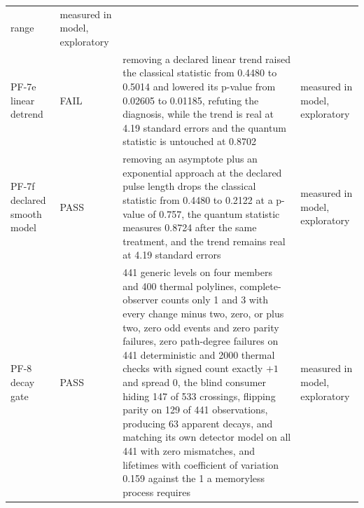 \documentclass[aps,pre,reprint,nofootinbib,floatfix]{revtex4-2}
\begin{document}
\begin{table}[p]
\begin{ruledtabular}
\begin{tabular}{L{2.5cm}L{1.9cm}L{9.0cm}L{2.7cm}}
range & measured in model, exploratory \\
PF-7e linear detrend & FAIL & removing a declared linear trend raised
the classical statistic from 0.4480 to 0.5014 and lowered its p-value
from 0.02605 to 0.01185, refuting the diagnosis, while the trend is
real at 4.19 standard errors and the quantum statistic is untouched at
0.8702 & measured in model, exploratory \\
PF-7f declared smooth model & PASS & removing an asymptote plus an
exponential approach at the declared pulse length drops the classical
statistic from 0.4480 to 0.2122 at a p-value of 0.757, the quantum
statistic measures 0.8724 after the same treatment, and the trend
remains real at 4.19 standard errors & measured in model,
exploratory \\
PF-8 decay gate & PASS & 441 generic levels on four members and 400
thermal polylines, complete-observer counts only 1 and 3 with every
change minus two, zero, or plus two, zero odd events and zero parity
failures, zero path-degree failures on 441 deterministic and 2000
thermal checks with signed count exactly $+1$ and spread 0, the blind
consumer hiding 147 of 533 crossings, flipping parity on 129 of 441
observations, producing 63 apparent decays, and matching its own
detector model on all 441 with zero mismatches, and lifetimes with
coefficient of variation 0.159 against the 1 a memoryless process
requires & measured in model, exploratory \\
\end{tabular}
\end{ruledtabular}
\end{table}
\end{document}
